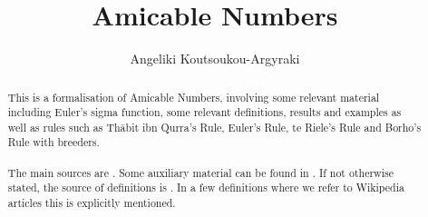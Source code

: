 \documentclass[11pt,a4paper]{article}
\begin{document}
\title{Amicable Numbers}
\author{Angeliki Koutsoukou-Argyraki}
\maketitle

\begin{abstract}
This is a formalisation of Amicable Numbers, involving some relevant material including
Euler's sigma function, some relevant definitions, results and examples as well as rules such as Th\={a}bit ibn Qurra's Rule, Euler's Rule, te Riele's Rule and Borho's Rule with breeders.
\\ \\
The main sources are \cite{garciaetal1} \cite{garciaetal2}. Some auxiliary material can be found in \cite{escott} \cite{sandifer}. If not otherwise stated, the source of definitions is \cite{garciaetal1}. In a few definitions where we refer to Wikipedia articles \cite{aliquotwiki} \cite{amicwiki} \cite{betrothedwiki} this is explicitly mentioned.
\end{abstract}

\newpage
\tableofcontents
\newpage



\newpage
\raggedright


\end{document}
